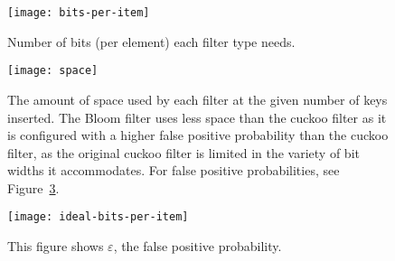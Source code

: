 \documentclass[letterpaper,twocolumn,10pt]{article}
\newcommand{\taffy}{stretchy}
\newcommand{\TBF}{SBF}
\newcommand{\TCF}{SCF}
\newcommand{\MTCF}{MSCF}
\newcommand{\taffy}{taffy}
\newcommand{\TBF}{TBF}
\newcommand{\TCF}{TCF}
\newcommand{\MTCF}{MTCF}
\begin{document}





\begin{figure}[b!]
  \texttt{[image: bits-per-item]}
  \caption{  \label{bits-per-item}
Number of bits (per element) each filter type needs.}
\end{figure}

\begin{figure}[b!]
  \texttt{[image: space]}
  \caption{
    \label{space-steps}
    The amount of space used by each filter at the given number of keys inserted.
    The Bloom filter uses less space than the cuckoo filter as it is configured with a higher false positive probability than the cuckoo filter, as the original cuckoo filter is limited in the variety of bit widths it accommodates.
    For false positive probabilities, see Figure~\ref{ideal-bits-per-item}.
  }
\end{figure}

\begin{figure}[b!]
  \texttt{[image: ideal-bits-per-item]}
  \caption{  \label{ideal-bits-per-item}
    This figure shows $\varepsilon$, the false positive probability.
  }
\end{figure}



\end{document}
